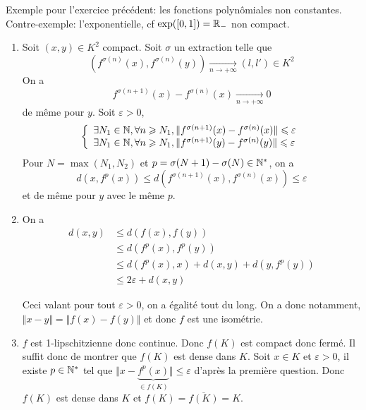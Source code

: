 \begin{remark}
	Exemple pour l'exercice précédent: les fonctions polynômiales non constantes. Contre-exemple: l'exponentielle, cf $\exp([0,1])=\mathbb{R}_{-}$ non compact.
\end{remark}

\begin{solution}
	\phantom{}
	\begin{enumerate}
		\item 
		Soit $(x,y)\in K^{2}$ compact. Soit $\sigma$ un extraction telle que 
		$$(f^{\sigma(n)}(x),f^{\sigma(n)}(y))\xrightarrow[n\to+\infty]{}(l,l')\in K^{2}$$
		On a 
		$$f^{\sigma(n+1)}(x)-f^{\sigma(n)}(x)\xrightarrow[n\to+\infty]{}0$$
		de même pour $y$. Soit $\varepsilon>0$,
		$$
		\left\{
			\begin{array}[]{l}
				\exists N_{1}\in\N,\forall n\geqslant N_{1},\Vert f^{\sigma(n+1)}(x)-f^{\sigma(n)}(x)\Vert\leqslant\varepsilon\\
			\exists N_{1}\in\N,\forall n\geqslant N_{1},\Vert f^{\sigma(n+1)}(y)-f^{\sigma(n)}(y)\Vert\leqslant\varepsilon
		\end{array}
		\right.
		$$
		Pour $N=\max(N_{1},N_{2})$ et $p=\sigma(N+1)-\sigma(N)\in\mathbb{N}^{*}$, on a 
		\begin{equation*}
			d(x,f^{p}(x))\leqslant d(f^{\sigma(n+1)}(x),f^{\sigma(n)}(x))\leqslant\varepsilon
		\end{equation*}
		et de même pour $y$ avec le même $p$.
	
		\item On a 
		\begin{align*}
			d(x,y)
			&\leqslant d(f(x),f(y))\\
			&\leqslant d(f^{p}(x),f^{p}(y))\\
			&\leqslant d(f^{p}(x),x)+d(x,y)+d(y,f^{p}(y))\\
			&\leqslant 2\varepsilon+d(x,y)
		\end{align*}

		Ceci valant pour tout $\varepsilon>0$, on a égalité tout du long. On a donc notamment, $\Vert x-y\Vert=\Vert f(x)-f(y)\Vert$ et donc $f$ est une isométrie.

		\item $f$ est 1-lipschitzienne donc continue. Donc $f(K)$ est compact donc fermé. Il suffit donc de montrer que $f(K)$ est dense dans $K$. Soit $x\in K$ et $\varepsilon>0$, il existe $p\in\mathbb{N}^{*}$ tel que $\Vert x-\underbrace{f^{p}(x)}_{\in f(K)}\Vert\leqslant\varepsilon$ d'après la première question. Donc $f(K)$ est dense dans $K$ et $f(K)=\overline{f(K)}=K$.
	\end{enumerate}
\end{solution}

